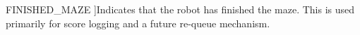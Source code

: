 \begin{Desc}
\begin{description}
{\hypertarget{namespaceRobotState_a35861cd80d5e6a7efe93588700256f40a628c13a47b81ba00108da3c0f4097416}{F\-I\-N\-I\-S\-H\-E\-D\-\_\-\-M\-A\-Z\-E}\label{namespaceRobotState_a35861cd80d5e6a7efe93588700256f40a628c13a47b81ba00108da3c0f4097416}
}]Indicates that the robot has finished the maze. This is used primarily for score logging and a future re-\/queue mechanism. \end{description}
\end{Desc}
